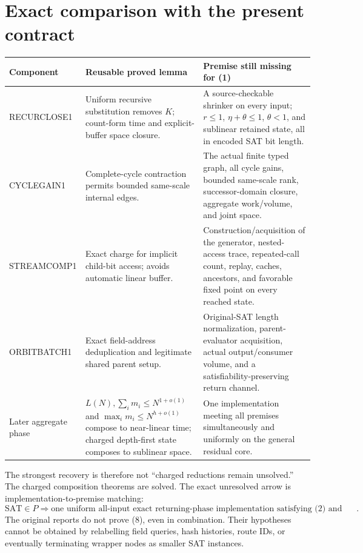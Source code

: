 \documentclass[11pt]{article}
\begin{document}
\section{Exact comparison with the present contract}
\small
\begin{longtable}{p{}p{}p{}}
\toprule
Component & Reusable proved lemma & Premise still missing for (1)\\
\midrule\endhead
RECURCLOSE1 & Uniform recursive substitution removes $K$; count-form time and
explicit-buffer space closure. & A source-checkable shrinker on every input;
$r\le1$, $\eta+\theta\le1$, $\theta<1$, and sublinear retained state, all in
encoded SAT bit length.\\
CYCLEGAIN1 & Complete-cycle contraction permits bounded same-scale internal
edges. & The actual finite typed graph, all cycle gains, bounded same-scale
rank, successor-domain closure, aggregate work/volume, and joint space.\\
STREAMCOMP1 & Exact charge for implicit child-bit access; avoids automatic
linear buffer. & Construction/acquisition of the generator, nested-access
trace, repeated-call count, replay, caches, ancestors, and favorable fixed
point on every reached state.\\
ORBITBATCH1 & Exact field-address deduplication and legitimate shared parent
setup. & Original-SAT length normalization, parent-evaluator acquisition,
actual output/consumer volume, and a satisfiability-preserving return channel.\\
Later aggregate phase & $L(N),\sum_i m_i\le N^{1+o(1)}$ and
$\max_i m_i\le N^{h+o(1)}$ compose to near-linear time; charged depth-first
state composes to sublinear space. & One implementation meeting all premises
simultaneously and uniformly on the general residual core.\\
\bottomrule
\end{longtable}\normalsize

The strongest recovery is therefore not ``charged reductions remain
unsolved.''  The charged composition theorems are solved.  The exact unresolved
arrow is implementation-to-premise matching:
\[
 \boxed{
 \mathrm{SAT}\in P\Longrightarrow
 \text{one uniform all-input exact returning-phase implementation satisfying
 (2) and the joint local/state budgets}.}
 \tag{8}
\]
The original reports do not prove (8), even in combination.  Their hypotheses
cannot be obtained by relabelling field queries, hash histories, route IDs, or
eventually terminating wrapper nodes as smaller SAT instances.
\end{document}
